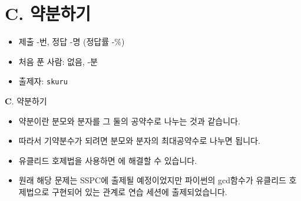 \section{C. 약분하기}

\begin{frame} %
    \begin{itemize}
        \item 제출 -번, 정답 -명 (정답률 -\%)
        \item 처음 푼 사람: 없음, -분
        \item 출제자: \texttt{skuru}
    \end{itemize}
\end{frame}

\begin{frame}{\textbf{C}. 약분하기}
    \begin{itemize}
        \item 약분이란 분모와 분자를 그 둘의 공약수로 나누는 것과 같습니다.
        \item 따라서 기약분수가 되려면 분모와 분자의 최대공약수로 나누면 됩니다.
        \item 유클리드 호제법을 사용하면 에 해결할 수 있습니다. \\[2em]
        \item 원래 해당 문제는 SSPC에 출제될 예정이었지만 파이썬의 gcd함수가 유클리드 호제법으로 구현되어 있는 관계로 연습 세션에 출제되었습니다.
    \end{itemize}
\end{frame}
